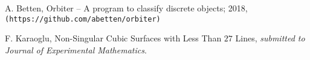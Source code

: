 \documentclass{article}
\begin{document}
\begin{thebibliography}{99}

 A. Betten, Orbiter -- A program to classify discrete objects; 2018,
\verb+(https://github.com/abetten/orbiter)+


F. Karaoglu, Non-Singular Cubic Surfaces with Less Than $27$ Lines, \emph{submitted to Journal of Experimental Mathematics}.
\end{thebibliography}
\end{document}
